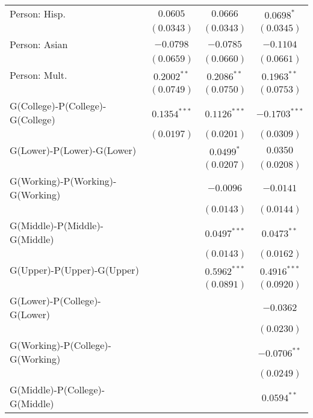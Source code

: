 \begin{center}
\begin{longtable}{l c c c}
Person: Hisp.                    & $0.0605$        & $0.0666$       & $0.0698^{*}$    \\
                                 & $(0.0343)$      & $(0.0343)$     & $(0.0345)$      \\
Person: Asian                    & $-0.0798$       & $-0.0785$      & $-0.1104$       \\
                                 & $(0.0659)$      & $(0.0660)$     & $(0.0661)$      \\
Person: Mult.                    & $0.2002^{**}$   & $0.2086^{**}$  & $0.1963^{**}$   \\
                                 & $(0.0749)$      & $(0.0750)$     & $(0.0753)$      \\
G(College)-P(College)-G(College) & $0.1354^{***}$  & $0.1126^{***}$ & $-0.1703^{***}$ \\
                                 & $(0.0197)$      & $(0.0201)$     & $(0.0309)$      \\
G(Lower)-P(Lower)-G(Lower)       &                 & $0.0499^{*}$   & $0.0350$        \\
                                 &                 & $(0.0207)$     & $(0.0208)$      \\
G(Working)-P(Working)-G(Working) &                 & $-0.0096$      & $-0.0141$       \\
                                 &                 & $(0.0143)$     & $(0.0144)$      \\
G(Middle)-P(Middle)-G(Middle)    &                 & $0.0497^{***}$ & $0.0473^{**}$   \\
                                 &                 & $(0.0143)$     & $(0.0162)$      \\
G(Upper)-P(Upper)-G(Upper)       &                 & $0.5962^{***}$ & $0.4916^{***}$  \\
                                 &                 & $(0.0891)$     & $(0.0920)$      \\
G(Lower)-P(College)-G(Lower)     &                 &                & $-0.0362$       \\
                                 &                 &                & $(0.0230)$      \\
G(Working)-P(College)-G(Working) &                 &                & $-0.0706^{**}$  \\
                                 &                 &                & $(0.0249)$      \\
G(Middle)-P(College)-G(Middle)   &                 &                & $0.0594^{**}$   \\

\end{longtable}
\end{center}
